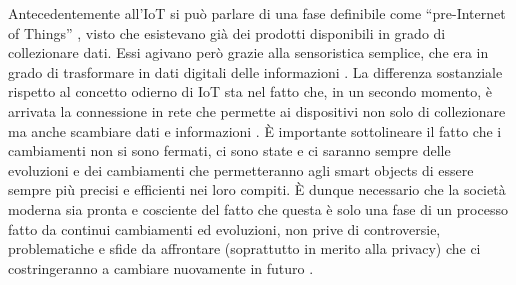 Antecedentemente all’IoT si può parlare di una fase definibile come “pre-Internet of Things” , visto che esistevano già dei prodotti disponibili in grado di collezionare dati. Essi agivano però grazie alla sensoristica semplice, che era in grado di trasformare in dati digitali delle informazioni . La differenza sostanziale rispetto al concetto odierno di IoT sta nel fatto che, in un secondo momento, è arrivata la connessione in rete che permette ai dispositivi non solo di collezionare ma anche scambiare dati e informazioni .
È importante sottolineare il fatto che i cambiamenti non si sono fermati, ci sono state e ci saranno sempre delle evoluzioni e dei cambiamenti che permetteranno agli smart objects di essere sempre più precisi e efficienti nei loro compiti. È dunque necessario che la società moderna sia pronta e cosciente del fatto che questa è solo una fase di un processo fatto da continui cambiamenti ed evoluzioni, non prive di controversie, problematiche e sfide da affrontare (soprattutto in merito alla privacy) che ci costringeranno a cambiare nuovamente in futuro . 
